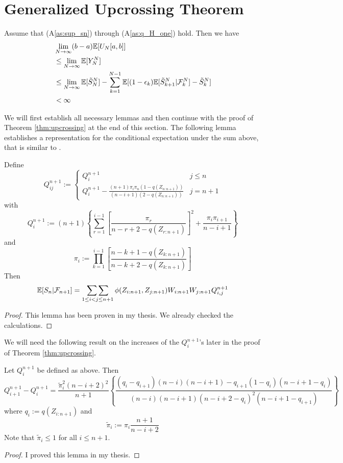 \section{Generalized Upcrossing Theorem}
\begin{thm}
	Assume that (A\ref{as:sup_sn}) through (A\ref{as:q_H_one}) hold. Then we have
	\begin{align}
		&\lim\limits_{N\to\infty}(b-a) \mathbb{E}[U_N[a,b]]\nonumber\\
		&\leq \lim\limits_{N\to\infty}\mathbb{E}[Y_N^N]\nonumber\\
		&\leq \lim\limits_{N\to\infty}\mathbb{E}[\tilde{S}_{N}^N] - \sum_{k=1}^{N-1} \mathbb{E}[(1-\epsilon_k) \mathbb{E}[\tilde{S}_{k+1}^N | \mathcal{F}_k^N]  - \tilde{S}_{k}^N]\nonumber\\
		&<\infty\nonumber
	\end{align}
	\label{thm:upcrossing}
\end{thm}
%
\noindent We will first establish all necessary lemmas and then continue with the proof of Theorem \ref{thm:upcrossing} at the end of this section. The following lemma establishes a representation for the conditional expectation under the sum above, that is similar to \cite{dikta2000strong}.
\begin{lemma}
	Define
	\[ Q_{ij}^{n+1} := \begin{cases} 
	Q_i^{n+1} & j\leq n\\
	Q_i^{n+1} - \frac{(n+1)\pi_i \pi_n (1-q(Z_{n:n+1}))}{(n-i+1)(2-q(Z_{n:n+1}))} & j=n+1
	\end{cases}
	\]
	with 
	$$Q_i^{n+1} := (n+1)\left\{\sum_{r=1}^{i-1}\left[\frac{\pi_r}{n-r+2-q(Z_{r:n+1})}\right]^2 + \frac{\pi_i \pi_{i+1}}{n-i+1} \right\}$$
	and 
	$$\pi_i := \prod_{k=1}^{i-1} \left[\frac{n-k+1-q(Z_{k:n+1})}{n-k+2-q(Z_{k:n+1})}\right]$$
	Then 
	$$\mathbb{E}[S_{n}|\mathcal{F}_{n+1}] = \mathop{\sum\sum}\limits_{1\leq i<j\leq n+1} \phi(Z_{i:n+1}, Z_{j:n+1}) W_{i:n+1} W_{j:n+1} Q_{i,j}^{n+1}$$
	\label{lem:qi}
	
	\begin{proof}
		This lemma has been proven in my thesis. We already checked the calculations.
	\end{proof}
\end{lemma}
%
\noindent We will need the following result on the increases of the $Q_i^{n+1}$'s later in the proof of Theorem \ref{thm:upcrossing}. 
\begin{lemma}
	Let $Q_i^{n+1}$ be defined as above. Then
	$$Q_{i+1}^{n+1} - Q_i^{n+1} = \frac{\tilde{\pi}_i^2(n-i+2)^2}{n+1} \left\{\frac{(q_i-q_{i+1})(n-i)(n-i+1) - q_{i+1}(1-q_i)(n-i+1-q_{i})}{(n-i)(n-i+1)(n-i+2-q_i)^2(n-i+1-q_{i+1})}\right\}$$
	where $q_i := q(Z_{i:n+1})$ and 
	$$\tilde{\pi}_i := \pi_i\frac{n+1}{n-i+2}$$
	\label{lem:qi_diff}
	Note that $\tilde{\pi}_i \leq 1$ for all $i\leq n+1$. 
	\begin{proof}
		I proved this lemma in my thesis. 
	\end{proof}
\end{lemma}

